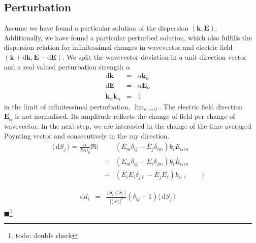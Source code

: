 \documentclass[12pt,a4paper,twoside,openright,BCOR10mm,headsepline,titlepage,abstracton,chapterprefix,final]{scrreprt}
\newcommand\Vector[1]{{\mathbf{#1}}}
\newcommand\vacuum{0}
\newcommand\wavenumber{k}
\newcommand\Wavevector{\Vector{\wavenumber}}
\newcommand\scalarEfield{E}
\newcommand\Efield{\Vector{\scalarEfield}}
\newcommand\vacuumpermeability{\scalarpermeability_{\vacuum}}
\newcommand\scalarpermeability{\mu}
\newcommand{\timeavg}[1]{{\langle\,#1\,\rangle}}
\newcommand{\remark}[1]{{\color{red}$\blacksquare$}\footnote{{\color{red}#1}}}
\newcommand\totald{\textrm{d}}
\begin{document}
\subsection{Perturbation}
Assume we have found a particular solution of the dispersion $( \Wavevector, \Efield )$.
Additionally, we have found a particular perturbed solution, 
which also fulfills the dispersion relation for infinitessimal changes 
in wavevector and electric field $( \Wavevector + \totald\Wavevector, \Efield + \totald\Efield)$.
We split the wavevector deviation in a unit direction vector and a real valued perturbation strength $\alpha$
\begin{eqnarray}
 \totald \Wavevector &=& \alpha \Wavevector_\alpha
 \\
 \totald \Efield &=& \alpha \Efield_\alpha
 \\
 \Wavevector_\alpha \overline{\Wavevector}_\alpha &=& 1
\end{eqnarray}
in the limit of infinitessimal perturbation, $\lim_{\alpha \rightarrow 0}$.
The electric field direction $\Efield_\alpha$ is not normalised.
Its amplitude reflects the change of field per change of wavevector.
In the next step, we are interested in the change of the time averaged Poynting vector and consecutively in the ray direction.
\begin{eqnarray}
 \timeavg{\totald S_j} =
  \frac{\alpha}{2\omega \vacuumpermeability} \Re 
  \bigg( &&
      (  \overline{\scalarEfield}_m \delta_{ij} - \overline{\scalarEfield}_j \delta_{im}  )
      \wavenumber_i \scalarEfield_{\alpha\,m}
  \nonumber \\
  &+& 
      (  \scalarEfield_m \delta_{ij} - \scalarEfield_i \delta_{jm}   )
      \wavenumber_i \overline{\scalarEfield}_{\alpha\,m}
  \nonumber \\
  &+& 
      (  \overline{\scalarEfield}_i \scalarEfield_i \delta_{j\ell} - \overline{\scalarEfield}_j \scalarEfield_\ell  )
      \wavenumber_{\alpha\,\ell}
  \qquad \bigg)
\end{eqnarray}





\begin{eqnarray}
 \totald d_i &=& \frac{ \timeavg{S_i} \timeavg{S_j}}{|\timeavg{S}|^3} ( \delta_{ij} - 1 )  \timeavg{\totald S_j}
 \label{eq:ray_direction_perturbation}
\end{eqnarray}
\remark{todo: double check}
\end{document}
